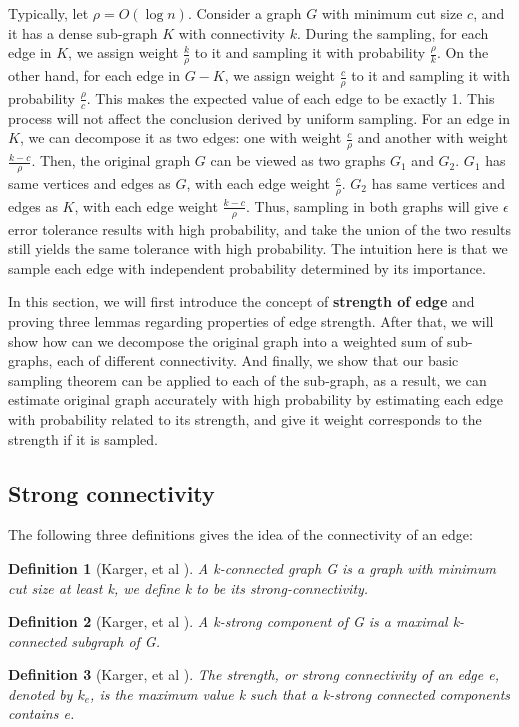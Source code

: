 \documentclass{article}
\newtheorem{definition}{Definition}
\begin{document}
Typically, let $\rho = O(\log n)$. Consider a graph $G$ with minimum cut size $c$, and it has a dense sub-graph $K$ with connectivity $k$. 
During the sampling, for each edge in $K$, we assign weight $\frac{k}{\rho}$ to it and sampling it with probability $\frac{\rho}{k}$. On the other hand, for each edge in $G-K$, we assign weight $\frac{c}{\rho}$ to it and sampling it with probability $\frac{\rho}{c}$. This makes the expected value of each edge to be exactly 1.
This process will not affect the conclusion derived by uniform sampling. For an edge in $K$, we can decompose it as two edges: one with weight $\frac{c}{\rho}$ and another with weight $\frac{k-c}{\rho}$. 
Then, the original graph $G$ can be viewed as two graphs $G_1$ and $G_2$. $G_1$ has same vertices and edges as $G$, with each edge weight $\frac{c}{\rho}$. $G_2$ has same vertices and edges as $K$, with each edge weight $\frac{k-c}{\rho}$.
Thus, sampling in both graphs will give $\epsilon$ error tolerance results with high probability, and take the union of the two results still yields the same tolerance with high probability.
The intuition here is that we sample each edge with independent probability determined by its importance. 

In this section, we will first introduce the concept of \textbf{strength of edge} and proving three lemmas regarding properties of edge strength. After that, we will show how can we decompose the original graph into a weighted sum of sub-graphs, each of different connectivity. And finally, we show that our basic sampling theorem can be applied to each of the sub-graph, as a result, we can estimate original graph accurately with high probability by estimating each edge with probability related to its strength, and give it weight corresponds to the strength if it is sampled.

\subsection{Strong connectivity}
The following three definitions gives the idea of the connectivity of an edge:

\begin{definition}[Karger, et al \cite{benczur2015randomized}]
A k-connected graph G is a graph with minimum cut size at least k, we define k to be its strong-connectivity.
\end{definition}
\begin{definition}[Karger, et al \cite{benczur2015randomized}]
A k-strong component of G is a maximal k-connected subgraph of G.
\end{definition}
\begin{definition}[Karger, et al \cite{benczur2015randomized}]
The strength, or strong connectivity of an edge e, denoted by $k_e$, is the maximum value k such that a k-strong connected components contains e.
\end{definition}
\end{document}

